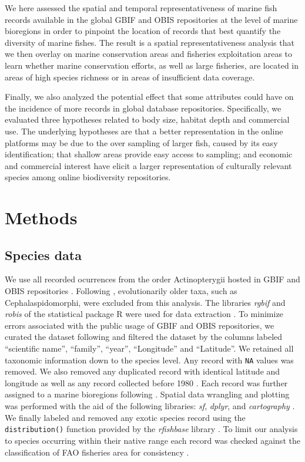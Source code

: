 \documentclass[12pt,authoryear]{elsarticle}
\begin{document}
We here assessed the spatial and temporal representativeness of marine fish records available in the global GBIF and OBIS repositories at the level of marine bioregions in order to pinpoint the location of records that best quantify the diversity of marine fishes. The result is a spatial representativeness analysis that we then overlay on marine conservation areas \citep{wcmc2022} and fisheries exploitation areas \citep{fao2014} to learn whether marine conservation efforts, as well as large fisheries, are located in areas of high species richness or in areas of insufficient data coverage. 

Finally, we also analyzed the potential effect that some attributes could have on the incidence of more records in global database repositories. Specifically, we evaluated three hypotheses related to body size, habitat depth and commercial use. The underlying hypotheses are that a better representation in the online platforms may be due to the over sampling of larger fish, caused by its easy identification; that shallow areas provide easy access to sampling; and economic and commercial interest have elicit a larger representation of culturally relevant species among online biodiversity repositories.  

\section{Methods}
\subsection{Species data}
\label{sec:spp-data}

We use all recorded ocurrences from the order Actinopterygii hosted in GBIF and OBIS repositories \citep{GBIFdata,OBISdata}. Following \cite{alo2021macroecology}, evolutionarily older taxa, such as Cephalaspidomorphi, were excluded from this analysis. The libraries \textit{rgbif} and \textit{robis} of the statistical package R were used for data extraction \citep{chamberlain2017, provoost2020, rcore2018}. To minimize errors associated with the public usage of GBIF and OBIS repositories, we curated the dataset following \cite{zizka2020} and filtered the dataset by the columns labeled ``scientific name'', ``family'', ``year'', ``Longitude'' and ``Latitude''. We retained all taxonomic information down to the species level. Any record with \texttt{NA} values was removed. We also removed any duplicated record with identical latitude and longitude as well as any record collected before 1980 \citep[see][]{alo2021macroecology,garcia2015}. Each record was further assigned to a marine bioregions following  \cite{costello2017marine}. Spatial data wrangling and plotting was performed with the aid of the following libraries: \textit{sf}, \textit{dplyr}, and \textit{cartography} \citep{giraud2016cartography, pebesma2018simple, wickham2021dplyr}. We finally labeled and removed any exotic species record using the \texttt{distribution()} function provided by the \textit{rfishbase} library \citep{boettiger2012rfishbase, froese2021fishbase}. To limit our analysis to species occurring within their native range each record was checked against the classification of FAO fisheries area for consistency \citep{fao2014}.
\end{document}
